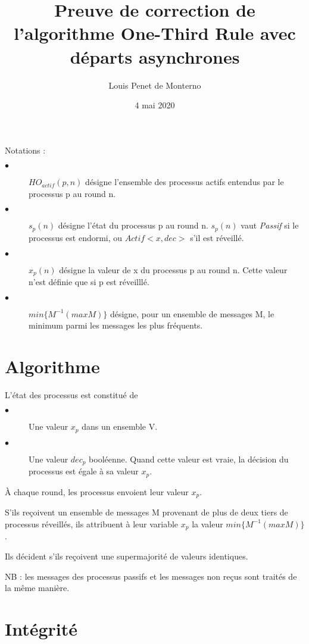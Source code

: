 \documentclass{article}
\title{Preuve de correction de l'algorithme One-Third Rule avec départs asynchrones}
\date{4 mai 2020}
\author{Louis Penet de Monterno}
\begin{document}
\maketitle
  
Notations :

\begin{description}

\item[$\bullet$] $HO_{actif}(p,n)$ désigne l'ensemble des processus actifs entendus par le processus p au round n.
\item[$\bullet$]  $s_p(n)$ désigne l'état du processus p au round n. $s_p(n)$ vaut \textit{Passif} si le processus est endormi, ou $Actif <x, dec>$ s'il est réveillé.
\item[$\bullet$]  $x_p(n)$ désigne la valeur de x du processus p au round n. Cette valeur n'est définie que si p est réveilllé.
\item[$\bullet$] $min \{M^{-1} (max M)\}$ désigne, pour un ensemble de messages M, le minimum parmi les messages les plus fréquents.
\end{description}

\section{Algorithme}

L'état des processus est constitué de 

\begin{description}

\item[$\bullet$] Une valeur $x_p$ dans un ensemble V.
\item[$\bullet$] Une valeur $dec_p$ booléenne. Quand cette valeur est vraie, la décision du processus est égale à sa valeur $x_p$.

\end{description}

À chaque round, les processus envoient leur valeur $x_p$.

S'ils reçoivent un ensemble de messages M provenant de plus de deux tiers de processus réveillés, ils attribuent à leur variable $x_p$ la valeur $min \{M^{-1} (max M)\}$.

Ils décident s'ils reçoivent une supermajorité de valeurs identiques.

NB : les messages des processus passifs et les messages non reçus sont traités de la même manière.

\section{Intégrité}
\end{document}
